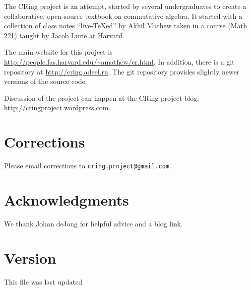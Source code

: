 The CRing project is an attempt, started by several undergraduates to create
a collaborative, open-source textbook on commutative algebra. 
It started with a collection of class notes ``live-\TeX ed'' by Akhil Mathew
taken in a course (Math 221) taught by Jacob Lurie at Harvard.

The main website for this project is 
\url{http://people.fas.harvard.edu/~amathew/cr.html}.
In addition, there is a
git repository at \url{http://cring.adeel.ru}. The git repository provides 
slightly newer versions of the source code.

Discussion of the project can happen at the CRing project blog,
\url{http://cringproject.wordpress.com}.


\section*{Corrections}
Please email corrections to
\verb=cring.project@gmail.com=.

\section*{Acknowledgments}

We thank Johan deJong for helpful advice and a blog link.


\section*{Version}
This file was last updated 


